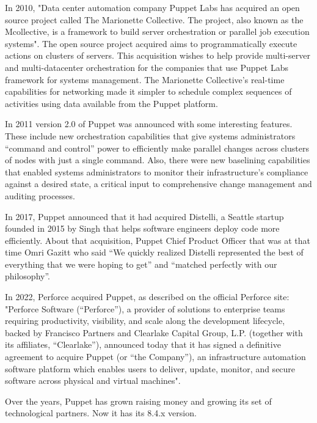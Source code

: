 \documentclass[12pt,a4paper,openright,twoside]{book}
\begin{document}
In 2010, "Data center automation company Puppet Labs has acquired an open source project called The Marionette Collective. The project, also known as the Mcollective, is a framework to build server orchestration or parallel job execution systems".\cite{puppetStory2}
The open source project acquired aims to programmatically execute actions on clusters of servers.
This acquisition wishes to help provide multi-server and multi-datacenter orchestration for the companies that use Puppet Labs framework for systems management.
The Marionette Collective's real-time capabilities for networking made it simpler to schedule complex sequences of activities using data available from the Puppet platform.\cite{puppetStory2}


In 2011 version 2.0 of Puppet was announced with some interesting features. These include new orchestration capabilities that give systems administrators “command and control”
power to efficiently make parallel changes across clusters of nodes with just a single
command. Also, there were new baselining capabilities that enabled systems administrators to monitor their
infrastructure's compliance against a desired state, a critical input to comprehensive
change management and auditing processes\cite{puppetStory3}.


In 2017, Puppet announced that it had acquired Distelli, a Seattle startup founded in 2015 by Singh that helps software engineers deploy code more efficiently.\cite{puppetStory4}
About that acquisition, Puppet Chief Product Officer that was at that time Omri Gazitt who said “We quickly realized Distelli represented the best of everything that we were hoping to get” and “matched perfectly with our philosophy”\cite{puppetStory4}.


In 2022, Perforce acquired Puppet, as described on the official Perforce site:
"Perforce Software (“Perforce”), a provider of solutions to enterprise teams requiring productivity, visibility, and scale along the development lifecycle, backed by Francisco Partners and Clearlake Capital Group, L.P. (together with its affiliates, “Clearlake”), announced today that it has signed a definitive agreement to acquire Puppet (or “the Company”), an infrastructure automation software platform which enables users to deliver, update, monitor, and secure software across physical and virtual machines"\cite{puppetStory5}.


Over the years, Puppet has grown raising money and growing its set of technological partners.
Now it has its 8.4.x version.
\end{document}
